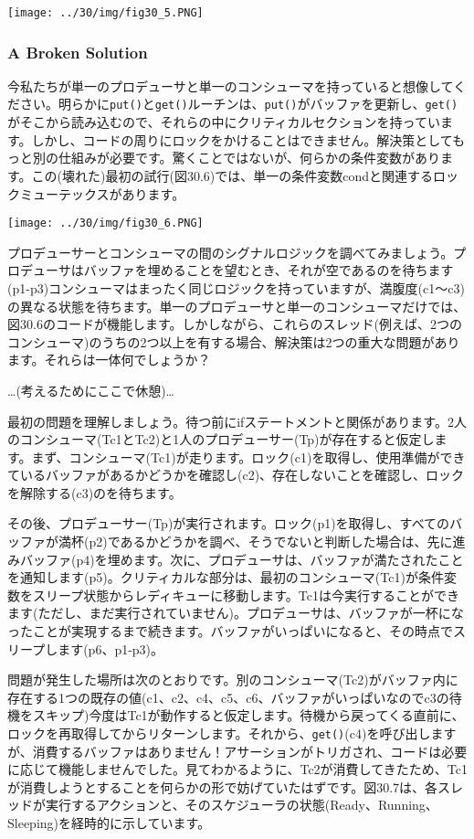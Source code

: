 \texttt{[image: ../30/img/fig30\_5.PNG]}

\hypertarget{a-broken-solution}{%
\subsubsection*{A Broken Solution}\label{a-broken-solution}}

今私たちが単一のプロデューサと単一のコンシューマを持っていると想像してください。明らかに\texttt{put()}と\texttt{get()}ルーチンは、\texttt{put()}がバッファを更新し、\texttt{get()}がそこから読み込むので、それらの中にクリティカルセクションを持っています。しかし、コードの周りにロックをかけることはできません。解決策としてもっと別の仕組みが必要です。驚くことではないが、何らかの条件変数があります。この(壊れた)最初の試行(図30.6)では、単一の条件変数condと関連するロックミューテックスがあります。

\texttt{[image: ../30/img/fig30\_6.PNG]}

プロデューサーとコンシューマの間のシグナルロジックを調べてみましょう。プロデューサはバッファを埋めることを望むとき、それが空であるのを待ちます(p1-p3)コンシューマはまったく同じロジックを持っていますが、満腹度(c1〜c3)の異なる状態を待ちます。単一のプロデューサと単一のコンシューマだけでは、図30.6のコードが機能します。しかしながら、これらのスレッド(例えば、2つのコンシューマ)のうちの2つ以上を有する場合、解決策は2つの重大な問題があります。それらは一体何でしょうか？

\ldots(考えるためにここで休憩)\ldots{}

最初の問題を理解しましょう。待つ前にifステートメントと関係があります。2人のコンシューマ(Tc1とTc2)と1人のプロデューサー(Tp)が存在すると仮定します。まず、コンシューマ(Tc1)が走ります。ロック(c1)を取得し、使用準備ができているバッファがあるかどうかを確認し(c2)、存在しないことを確認し、ロックを解除する(c3)のを待ちます。

その後、プロデューサー(Tp)が実行されます。ロック(p1)を取得し、すべてのバッファが満杯(p2)であるかどうかを調べ、そうでないと判断した場合は、先に進みバッファ(p4)を埋めます。次に、プロデューサは、バッファが満たされたことを通知します(p5)。クリティカルな部分は、最初のコンシューマ(Tc1)が条件変数をスリープ状態からレディキューに移動します。Tc1は今実行することができます(ただし、まだ実行されていません)。プロデューサは、バッファが一杯になったことが実現するまで続きます。バッファがいっぱいになると、その時点でスリープします(p6、p1-p3)。

問題が発生した場所は次のとおりです。別のコンシューマ(Tc2)がバッファ内に存在する1つの既存の値(c1、c2、c4、c5、c6、バッファがいっぱいなのでc3の待機をスキップ)今度はTc1が動作すると仮定します。待機から戻ってくる直前に、ロックを再取得してからリターンします。それから、\texttt{get()}(c4)を呼び出しますが、消費するバッファはありません！アサーションがトリガされ、コードは必要に応じて機能しませんでした。見てわかるように、Tc2が消費してきたため、Tc1が消費しようとすることを何らかの形で妨げていたはずです。図30.7は、各スレッドが実行するアクションと、そのスケジューラの状態(Ready、Running、Sleeping)を経時的に示しています。

